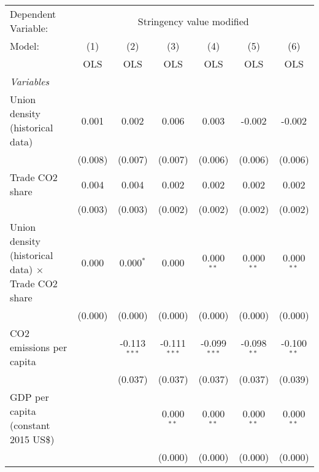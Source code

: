 
\begingroup
\centering
\begin{tabular}{lcccccc}
   \toprule
   Dependent Variable: & \multicolumn{6}{c}{Stringency value modified}\\
   Model:                                                    & (1)     & (2)            & (3)            & (4)            & (5)           & (6)\\  
                                                             &  OLS    & OLS            & OLS            & OLS            & OLS           & OLS\\  
   \midrule
   \emph{Variables}\\
   Union density (historical data)                           & 0.001   & 0.002          & 0.006          & 0.003          & -0.002        & -0.002\\   
                                                             & (0.008) & (0.007)        & (0.007)        & (0.006)        & (0.006)       & (0.006)\\   
   Trade CO2 share                                           & 0.004   & 0.004          & 0.002          & 0.002          & 0.002         & 0.002\\   
                                                             & (0.003) & (0.003)        & (0.002)        & (0.002)        & (0.002)       & (0.002)\\   
   Union density (historical data) $\times$ Trade CO2 share  & 0.000   & 0.000$^{*}$    & 0.000          & 0.000$^{**}$   & 0.000$^{**}$  & 0.000$^{**}$\\   
                                                             & (0.000) & (0.000)        & (0.000)        & (0.000)        & (0.000)       & (0.000)\\   
   CO2 emissions per capita                                  &         & -0.113$^{***}$ & -0.111$^{***}$ & -0.099$^{***}$ & -0.098$^{**}$ & -0.100$^{**}$\\   
                                                             &         & (0.037)        & (0.037)        & (0.037)        & (0.037)       & (0.039)\\   
   GDP per capita (constant 2015 US\$)                       &         &                & 0.000$^{**}$   & 0.000$^{**}$   & 0.000$^{**}$  & 0.000$^{**}$\\   
                                                             &         &                & (0.000)        & (0.000)        & (0.000)       & (0.000)\\   

\end{tabular}
